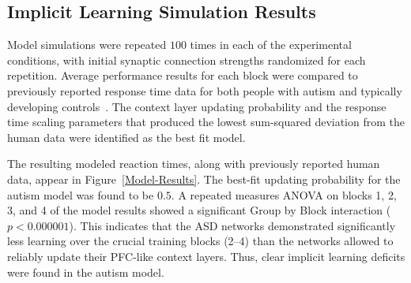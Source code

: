 \subsection{Implicit Learning Simulation Results}
Model simulations were repeated $100$ times in each of the experimental conditions, with initial synaptic connection strengths randomized for each repetition. Average performance results for each block were compared to previously reported response time data for both people with autism and typically developing controls~\cite{MostofskySH:2000:Procedural}. The context layer updating probability and the response time scaling parameters that produced the lowest sum-squared deviation from the human data were identified as the best fit model.

The resulting modeled reaction times, along with previously reported human data, appear in Figure~\ref{Model-Results}. The best-fit updating probability for the autism model was found to be $0.5$. A repeated measures ANOVA on blocks 1, 2, 3, and 4 of the model results showed a significant Group by Block interaction ($p < 0.000001$). This indicates that the ASD networks demonstrated significantly less learning over the crucial training blocks (2--4) than the networks allowed to reliably update their PFC-like context layers. Thus, clear implicit learning deficits were found in the autism model.


